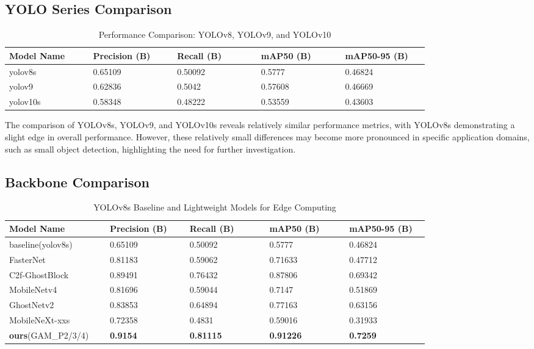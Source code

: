 \documentclass[10pt]{article}
\begin{document}
\subsection{YOLO Series Comparison}
\begin{table}[hbtp]
    \centering
    \caption{Performance Comparison: YOLOv8, YOLOv9, and YOLOv10}
    \label{tab:yolov8-v9-v10}
    \begin{tabular}{p{0.16\linewidth}p{0.16\linewidth}p{0.16\linewidth}p{0.16\linewidth}p{0.16\linewidth}}
    \toprule
    Model Name & Precision (B) & Recall (B) & mAP50 (B) & mAP50-95 (B) \\ \midrule
    yolov8s    & 0.65109       & 0.50092    & 0.5777    & 0.46824      \\
    yolov9     & 0.62836       & 0.5042     & 0.57608   & 0.46669      \\
    yolov10s   & 0.58348       & 0.48222    & 0.53559   & 0.43603      \\ \bottomrule
    \end{tabular}
    \end{table}
The comparison of YOLOv8s, YOLOv9, and YOLOv10s reveals relatively similar performance metrics, with YOLOv8s demonstrating a slight edge in overall performance. However, these relatively small differences may become more pronounced in specific application domains, such as small object detection, highlighting the need for further investigation. 

\subsection{Backbone Comparison}
\begin{table}[]
    \centering
    \caption{YOLOv8s Baseline and Lightweight Models for Edge Computing}
    \label{tab:yolov8s-lightweight}
    \begin{tabular}{p{0.16\linewidth}p{0.16\linewidth}p{0.16\linewidth}p{0.16\linewidth}p{0.16\linewidth}}
    \toprule
    Model Name                  & Precision (B) & Recall (B) & mAP50 (B) & mAP50-95 (B) \\ \midrule
    baseline(yolov8s)                     & 0.65109       & 0.50092    & 0.5777    & 0.46824      \\
    FasterNet           & 0.81183       & 0.59062    & 0.71633   & 0.47712      \\
    C2f-GhostBlock            & 0.89491       & 0.76432    & 0.87806   & 0.69342           \\
    MobileNetv4        & 0.81696       & 0.59044    & 0.7147    & 0.51869      \\
    GhostNetv2         & 0.83853       & 0.64894    & 0.77163   & 0.63156      \\
    MobileNeXt-xxs         & 0.72358       & 0.4831     & 0.59016   & 0.31933      \\        
    \textbf{ours}(GAM\_P2/3/4) & \textbf{0.9154} & \textbf{0.81115} & \textbf{0.91226} & \textbf{0.7259} \\
    \bottomrule
    \end{tabular}
    \end{table}
\end{document}
